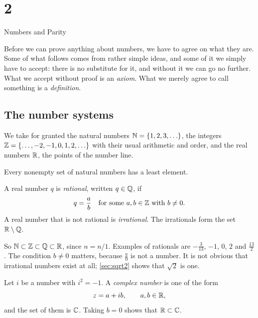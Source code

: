 \chapter{2}{Numbers and Parity}

Before we can prove anything about numbers, we have to agree on what they
are. Some of what follows comes from rather simple ideas, and some of it we
simply have to accept: there is no substitute for it, and without it we can
go no further. What we accept without proof is an \emph{axiom}. What we
merely agree to call something is a \emph{definition}.

\section{The number systems}\label{sec:number-systems}

We take for granted the natural numbers $\N = \set{1, 2, 3, \dots}$, the
integers $\Z = \set{\dots, -2, -1, 0, 1, 2, \dots}$ with their usual
arithmetic and order, and the real numbers $\mathbb{R}$, the points of the number
line.

\begin{axiom}\label{ax:well-ordering}
  Every nonempty set of natural numbers has a least element.
\end{axiom}

\begin{definition}\label{def:rational}
  A real number $q$ is \emph{rational}, written $q \in \mathbb{Q}$, if
  \[
    q = \frac ab \quad\text{for some } a, b \in \mathbb{Z} \text{ with } b \neq 0.
  \]
  A real number that is not rational is \emph{irrational}. The irrationals
  form the set $\mathbb{R} \setminus \mathbb{Q}$.
\end{definition}

So $\mathbb{N} \subset \mathbb{Z} \subset \mathbb{Q} \subset \mathbb{R}$, since $n = n/1$. Examples of
rationals are $-\frac{3}{13}$, $-1$, $0$, $2$ and $\frac{13}{2}$. The
condition $b \neq 0$ matters, because $\frac a0$ is not a number. It is not
obvious that irrational numbers exist at all; \cref{sec:sqrt2} shows that
$\sqrt2$ is one.

\begin{definition}\label{def:complex}
  Let $i$ be a number with $i^2 = -1$. A \emph{complex number} is one of the
  form
  \[
    z = a + ib, \qquad a, b \in \mathbb{R},
  \]
  and the set of them is $\mathbb{C}$. Taking $b = 0$ shows that $\mathbb{R} \subset \mathbb{C}$.
\end{definition}

